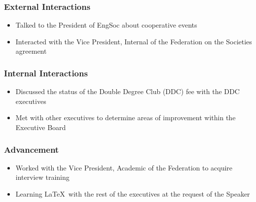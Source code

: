 \subsubsection*{External Interactions}
\begin{itemize}
\item Talked to the President of EngSoc about cooperative events
\item Interacted with the Vice President, Internal of the Federation on the Societies agreement
\end{itemize}

\subsubsection*{Internal Interactions}
\begin{itemize}
\item Discussed the status of the Double Degree Club (DDC) fee with the DDC executives
\item Met with other executives to determine areas of improvement within the Executive Board
\end{itemize}

\subsubsection*{Advancement}
\begin{itemize}
\item Worked with the Vice President, Academic of the Federation to acquire interview training
\item Learning \LaTeX\ with the rest of the executives at the request of the Speaker
\end{itemize}